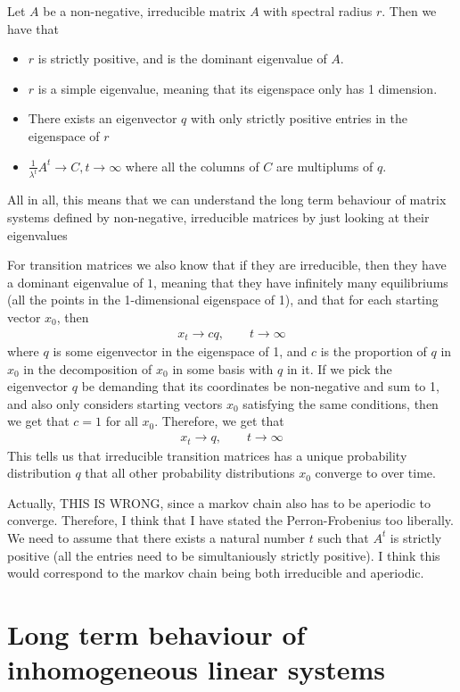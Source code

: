 \documentclass[12pt]{article}
\begin{document}
Let $A$ be a non-negative, irreducible matrix $A$ with spectral radius $r$. Then we have that 
\begin{itemize}
\item $r$ is strictly positive, and is the dominant eigenvalue of $A$.
\item $r$ is a simple eigenvalue, meaning that its eigenspace only has 1 dimension.
\item There exists an eigenvector $q$ with only strictly positive entries in the eigenspace of $r$
\item $\frac{1}{\lambda^t} A^t \to C, t\to \infty$ where all the columns of $C$ are multiplums of $q$.
\end{itemize}
All in all, this means that we can understand the long term behaviour of matrix systems defined by non-negative, irreducible matrices by just looking at their eigenvalues

For transition matrices we also know that if they are irreducible, then they have a dominant eigenvalue of $1$, meaning that they have infinitely many equilibriums (all the points in the 1-dimensional eigenspace of 1), and that for each starting vector $x_0$, then
\begin{align}
x_t \to cq,\qquad t\to \infty
\end{align}
where $q$ is some eigenvector in the eigenspace of 1, and $c$ is the proportion of $q$ in $x_0$ in the decomposition of $x_0$ in some basis with $q$ in it. If we pick the eigenvector $q$ be demanding that its coordinates be non-negative and sum to 1, and also only considers starting vectors $x_0$ satisfying the same conditions, then we get that $c=1$ for all $x_0$. Therefore, we get that 
\begin{align}
x_t \to q,\qquad t\to \infty
\end{align}
This tells us that irreducible transition matrices has a unique probability distribution $q$ that all other probability distributions $x_0$ converge to over time.

Actually, THIS IS WRONG, since a markov chain also has to be aperiodic to converge. Therefore, I think that I have stated the Perron-Frobenius too liberally. We need to assume that there exists a natural number $t$ such that $A^t$ is strictly positive (all the entries need to be simultaniously strictly positive). I think this would correspond to the markov chain being both irreducible and aperiodic.

\section{Long term behaviour of inhomogeneous linear systems}
\end{document}
